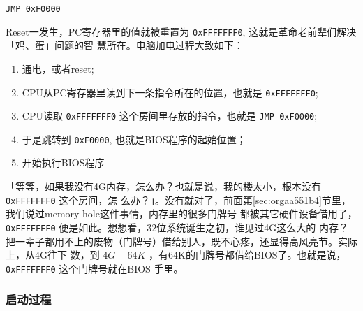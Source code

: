 \documentclass{wx672ctexart}
\begin{document}
\begin{verbatim}
JMP 0xF0000
\end{verbatim}

Reset一发生，PC寄存器里的值就被重置为 \texttt{0xFFFFFFF0}, 这就是革命老前辈们解决「鸡、蛋」问题的智
慧所在。电脑加电过程大致如下：
\begin{enumerate}
\item 通电，或者reset;
\item CPU从PC寄存器里读到下一条指令所在的位置，也就是 \texttt{0xFFFFFFF0};
\item CPU读取 \texttt{0xFFFFFFF0} 这个房间里存放的指令，也就是 \texttt{JMP 0xF0000};
\item 于是跳转到 \texttt{0xF0000}, 也就是BIOS程序的起始位置；
\item 开始执行BIOS程序
\end{enumerate}

「等等，如果我没有4G内存，怎么办？也就是说，我的楼太小，根本没有 \texttt{0xFFFFFFF0} 这个房间，怎
么办？」。没有就对了，前面第\ref{sec:orgaa551b4}节里，我们说过memory hole这件事情，内存里的很多门牌号
都被其它硬件设备借用了， \texttt{0xFFFFFFF0} 便是如此。想想看，32位系统诞生之初，谁见过4G这么大的
内存？把一辈子都用不上的废物（门牌号）借给别人，既不心疼，还显得高风亮节。实际上，从4G往下
数，到 \(4G-64K\) ，有64K的门牌号都借给BIOS了。也就是说， \texttt{0xFFFFFFF0} 这个门牌号就在BIOS
手里。

\subsubsection{启动过程}
\label{sec:orgaac55c3}
\end{document}
